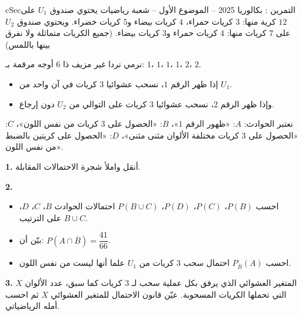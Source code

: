 \documentclass[12pt,a4paper]{article}
\newenvironment{BOX}[2]{\begin{otherlanguage}{english}\begin{arbox}{#1}{#2}}{\end{arbox}\end{otherlanguage}}
\newcounter{exo}
\newenvironment{tamrin}[1]{\stepcounter{exo}\begin{BOX}{cSec}{التمرين \theexo: #1}}{\end{BOX}}
\newenvironment{LTR}{\begin{otherlanguage}{english}}{\end{otherlanguage}}
\renewcommand{\ldots}{\mathinner{\ldotp\ldotp\ldotp}}
\newenvironment{sq}{\begin{itemize}[leftmargin=2.4em,itemsep=3pt]}{\end{itemize}}
\newcommand{\qa}{\item[(أ)]}\newcommand{\qb}{\item[(ب)]}\newcommand{\qc}{\item[(جـ)]}\newcommand{\qd}{\item[(د)]}\newcommand{\qe}{\item[(هـ)]}
\newcommand{\QQ}[1]{\par\smallskip\textbf{#1.} }
\begin{document}
\begin{tamrin}{بكالوريا 2025 -- الموضوع الأول -- شعبة رياضيات}
يحتوي صندوق $U_1$ على $12$ كرية منها: $3$ كريات حمراء، $4$ كريات بيضاء و$5$ كريات خضراء.
ويحتوي صندوق $U_2$ على $7$ كريات منها: $4$ كريات حمراء و$3$ كريات بيضاء.
(جميع الكريات متماثلة ولا نفرق بينها باللمس)

نرمي نردا غير مزيف ذا $6$ أوجه مرقمة بـ: $1$، $1$، $1$، $1$، $2$، $2$.
\begin{itemize}
\item إذا ظهر الرقم $1$، نسحب عشوائيا $3$ كريات في آن واحد من $U_1$.
\item وإذا ظهر الرقم $2$، نسحب عشوائيا $3$ كريات على التوالي من $U_2$ دون إرجاع.
\end{itemize}
نعتبر الحوادث: $A$: «ظهور الرقم $1$»، $B$: «الحصول على $3$ كريات من نفس اللون»،
$C$: «الحصول على $3$ كريات مختلفة الألوان مثنى مثنى»، $D$: «الحصول على كريتين بالضبط من نفس اللون».
\begin{center}\begin{LTR}\end{LTR}\end{center}
\QQ{1} أنقل واملأ شجرة الاحتمالات المقابلة.
\QQ{2}
\begin{sq}
\qa احسب $P(B)$، $P(C)$، $P(D)$، $P(B\cup C)$ احتمالات الحوادث $B$، $C$، $D$، $B\cup C$ على الترتيب.
\qb بيّن أن: $P(A\cap\overline{B})=\dfrac{41}{66}$.
\qc احسب $P_{\overline{B}}(A)$ احتمال سحب $3$ كريات من $U_1$ علما أنها ليست من نفس اللون.
\end{sq}
\QQ{3} $X$ المتغير العشوائي الذي يرفق بكل عملية سحب لـ $3$ كريات كما سبق، عدد الألوان التي تحملها الكريات المسحوبة.
عيّن قانون الاحتمال للمتغير العشوائي $X$ ثم احسب أمله الرياضياتي.
\end{tamrin}
\end{document}
